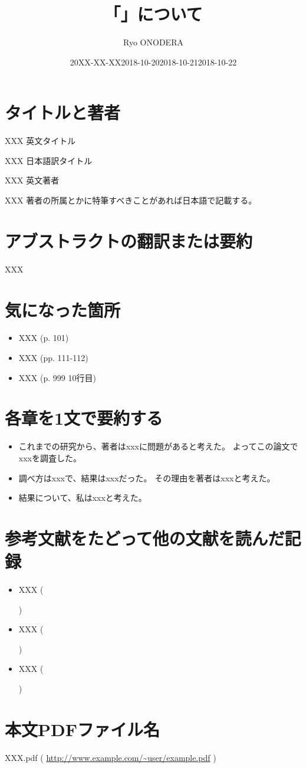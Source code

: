 \documentclass[a4j]{jsarticle}
\title{「」について}
\author[1]{Ryo ONODERA}
\affil[1]{tetera.org}
\date{20XX-XX-XX}
\begin{document}

\maketitle


\section{タイトルと著者}
XXX 英文タイトル
~\cite{example}

XXX 日本語訳タイトル

XXX 英文著者

XXX 著者の所属とかに特筆すべきことがあれば日本語で記載する。

\section{アブストラクトの翻訳または要約}
XXX


\section{気になった箇所}
\begin{itemize}
 	\item	XXX (p. 101)
 	\item	XXX (pp. 111-112)
 	\item	XXX (p. 999 10行目)
\end{itemize}


\section{各章を1文で要約する}
\begin{itemize}
 	\item	これまでの研究から、著者はxxxに問題があると考えた。
		よってこの論文でxxxを調査した。
 	\item 	調べ方はxxxで、結果はxxxだった。
		その理由を著者はxxxと考えた。
 	\item	結果について、私はxxxと考えた。
\end{itemize}


\section{参考文献をたどって他の文献を読んだ記録}
\begin{itemize}
 	\item	XXX (\date{2018-10-20})
		~\cite{example-webpage}
 	\item	XXX (\date{2018-10-21})
		~\cite{example-webpage}
 	\item	XXX (\date{2018-10-22})
		~\cite{example-webpage}
\end{itemize}


\section{本文PDFファイル名}
XXX.pdf
(
\url{http://www.example.com/~user/example.pdf}
)


\end{document}
